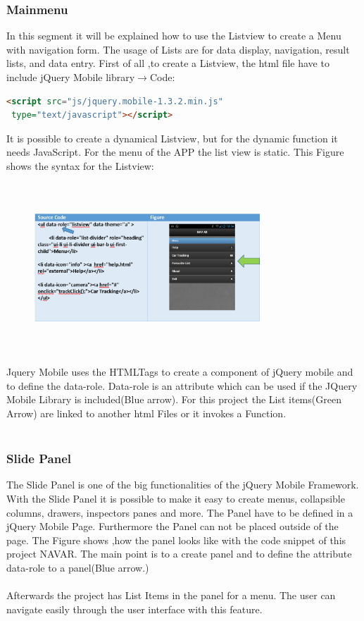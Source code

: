 \subsubsection{Mainmenu}
In this segment it will be explained how to use the Listview to create a Menu with navigation form. The usage of Lists are for data display, navigation, result lists, and data entry. First of all ,to create a  Listview, the html file have to include jQuery Mobile library$\rightarrow$Code:
\begin{lstlisting}[language=html,caption= Input Library,captionpos=b]
<script src="js/jquery.mobile-1.3.2.min.js"
 type="text/javascript"></script>

\end{lstlisting}

It is possible to create a dynamical Listview, but for the dynamic function it needs JavaScript. For the menu of the APP the list view is static. This Figure shows the syntax for the Listview:

\begin{figure}[htbp]
\centering
\includegraphics[width=240pt,height=180pt,keepaspectratio]{graphics/Menu.PNG}
\end{figure}

Jquery Mobile uses the HTMLTags  to create a component of  jQuery mobile and to define the data-role. Data-role is an attribute which can be used if the JQuery Mobile Library is included(Blue arrow). For this project the List items(Green Arrow) are linked to another html Files or it invokes a Function.\\\\

\subsubsection{Slide Panel}
The Slide Panel is one of the big functionalities of the jQuery Mobile Framework. With the Slide Panel it is possible to make it easy to create menus, collapsible columns, drawers, inspectors panes and more. The Panel have to be defined in a jQuery Mobile Page. Furthermore the Panel can not be placed outside of the page. The Figure shows ,how the panel looks like with the code snippet of this project NAVAR. The main point is to a create panel and to define the attribute data-role to a panel(Blue arrow.)\\\\
Afterwards the project has List Items in the panel for a menu. The user can navigate easily through the user interface with this feature.\cite{Panel}


